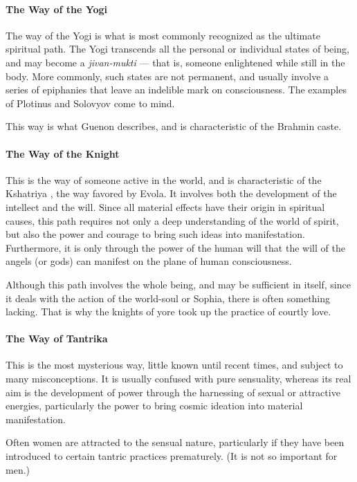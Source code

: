 \paragraph{The Way of the Yogi}
The way of the Yogi is what is most commonly recognized as the ultimate spiritual path. The Yogi transcends all the personal or individual states of being, and may become a \emph{jivan-mukti} — that is, someone enlightened while still in the body. More commonly, such states are not permanent, and usually involve a series of epiphanies that leave an indelible mark on consciousness. The examples of Plotinus and Solovyov come to mind. 

This way is what Guenon describes, and is characteristic of the Brahmin caste. 

\paragraph{The Way of the Knight}
This is the way of someone active in the world, and is characteristic of the Kshatriya , the way favored by Evola. It involves both the development of the intellect and the will. Since all material effects have their origin in spiritual causes, this path requires not only a deep understanding of the world of spirit, but also the power and courage to bring such ideas into manifestation. Furthermore, it is only through the power of the human will that the will of the angels (or gods) can manifest on the plane of human consciousness. 

Although this path involves the whole being, and may be sufficient in itself, since it deals with the action of the world-soul or Sophia, there is often something lacking. That is why the knights of yore took up the practice of courtly love. 

\paragraph{The Way of Tantrika}
This is the most mysterious way, little known until recent times, and subject to many misconceptions. It is usually confused with pure sensuality, whereas its real aim is the development of power through the harnessing of sexual or attractive energies, particularly the power to bring cosmic ideation into material manifestation. 

Often women are attracted to the sensual nature, particularly if they have been introduced to certain tantric practices prematurely. (It is not so important for men.) 

